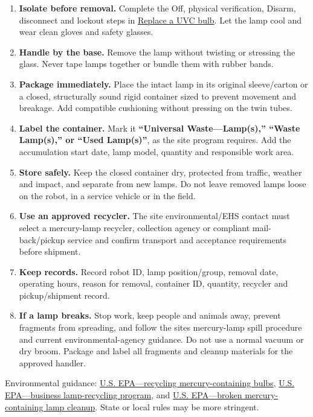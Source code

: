 \documentclass[
  10pt,
  letterpaper,
  openany]{report}
\providecommand{\tightlist}{%
  \setlength{\itemsep}{0pt}\setlength{\parskip}{0pt}}
\begin{document}
\begin{enumerate}
\tightlist
\item
  \textbf{Isolate before removal.} Complete the Off, physical
  verification, Disarm, disconnect and lockout steps in
  \hyperref[uvc-replacement]{Replace a UVC bulb}. Let the lamp cool and
  wear clean gloves and safety glasses.
\item
  \textbf{Handle by the base.} Remove the lamp without twisting or
  stressing the glass. Never tape lamps together or bundle them with
  rubber bands.
\item
  \textbf{Package immediately.} Place the intact lamp in its original
  sleeve/carton or a closed, structurally sound rigid container sized to
  prevent movement and breakage. Add compatible cushioning without
  pressing on the twin tubes.
\item
  \textbf{Label the container.} Mark it \textbf{``Universal
  Waste---Lamp(s),'' ``Waste Lamp(s),'' or ``Used Lamp(s)''}, as the
  site program requires. Add the accumulation start date, lamp model,
  quantity and responsible work area.
\item
  \textbf{Store safely.} Keep the closed container dry, protected from
  traffic, weather and impact, and separate from new lamps. Do not leave
  removed lamps loose on the robot, in a service vehicle or in the
  field.
\item
  \textbf{Use an approved recycler.} The site environmental/EHS contact
  must select a mercury-lamp recycler, collection agency or compliant
  mail-back/pickup service and confirm transport and acceptance
  requirements before shipment.
\item
  \textbf{Keep records.} Record robot ID, lamp position/group, removal
  date, operating hours, reason for removal, container ID, quantity,
  recycler and pickup/shipment record.
\item
  \textbf{If a lamp breaks.} Stop work, keep people and animals away,
  prevent fragments from spreading, and follow the
  site\textquotesingle s mercury-lamp spill procedure and current
  environmental-agency guidance. Do not use a normal vacuum or dry
  broom. Package and label all fragments and cleanup materials for the
  approved handler.
\end{enumerate}

Environmental guidance:
\href{https://www.epa.gov/mercury/recycling-and-disposal-cfls-and-other-bulbs-contain-mercury}{U.S.
EPA---recycling mercury-containing bulbs},
\href{https://www.epa.gov/hw/establishing-recycling-program-mercury-containing-light-bulbs}{U.S.
EPA---business lamp-recycling program}, and
\href{https://www.epa.gov/mercury/cleaning-broken-cfl}{U.S. EPA---broken
mercury-containing lamp cleanup}. State or local rules may be more
stringent.
\end{document}
